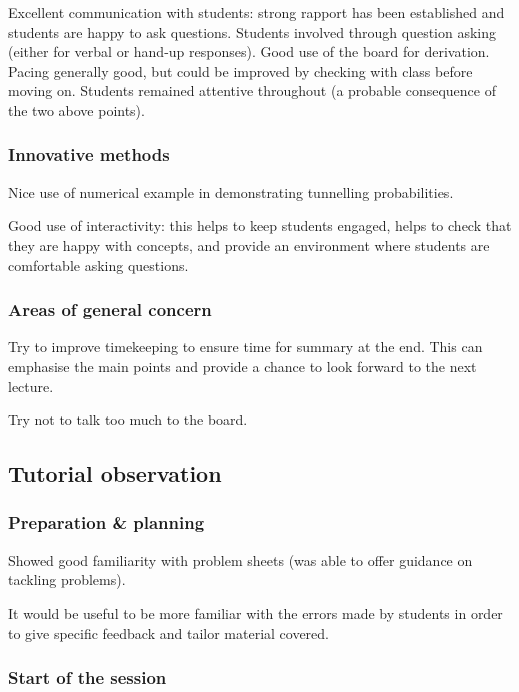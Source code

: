 Excellent communication with students: strong rapport has been established and students are happy to ask questions. Students involved through question asking (either for verbal or hand-up responses). Good use of the board for derivation. Pacing generally good, but could be improved by checking with class before moving on. Students remained attentive throughout (a probable consequence of the two above points).

\subsubsection{Innovative methods}

Nice use of numerical example in demonstrating tunnelling probabilities.

Good use of interactivity: this helps to keep students engaged, helps to check that they are happy with concepts, and provide an environment where students are comfortable asking questions.

\subsubsection{Areas of general concern}

Try to improve timekeeping to ensure time for summary at the end. This can emphasise the main points and provide a chance to look forward to the next lecture.

Try not to talk too much to the board.


\subsection{Tutorial observation}\label{sec:other-tutorial}

\subsubsection{Preparation \& planning}

Showed good familiarity with problem sheets (was able to offer guidance on tackling problems).

It would be useful to be more familiar with the errors made by students in order to give specific feedback and tailor material covered.

\subsubsection{Start of the session}\label{sec:other-tutorial-start}


